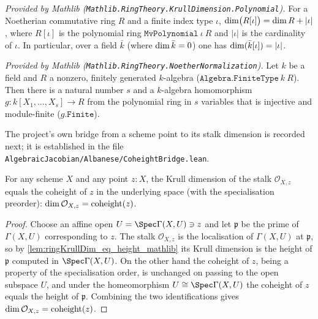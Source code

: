 \begin{lemma}
  \label{lem:mvpoly_ringKrullDim_mathlib}
  \mathlibok
  \textit{Provided by Mathlib (\texttt{Mathlib.RingTheory.KrullDimension.Polynomial}).}
  For a Noetherian commutative ring \(R\) and a finite index type \(\iota\),
  \(\dim\bigl(R[\iota]\bigr) = \dim R + \lvert\iota\rvert\), where
  \(R[\iota]\) is the polynomial ring \(\texttt{MvPolynomial}\ \iota\ R\) and
  \(\lvert\iota\rvert\) is the cardinality of \(\iota\).  In particular, over a field
  \(\bar k\) (where \(\dim \bar k = 0\)) one has \(\dim(\bar k[\iota]) =
  \lvert\iota\rvert\).
\end{lemma}

\begin{lemma}
  \label{lem:noether_normalization_mathlib}
  \mathlibok
  \textit{Provided by Mathlib (\texttt{Mathlib.RingTheory.NoetherNormalization}).}
  Let \(k\) be a field and \(R\) a nonzero, finitely generated \(k\)-algebra
  (\(\texttt{Algebra.FiniteType}\ k\ R\)).  Then there is a natural number \(s\) and a
  \(k\)-algebra homomorphism \(g : k[X_1,\dots,X_s] \to R\) from the polynomial ring in
  \(s\) variables that is injective and module-finite (\(g.\texttt{Finite}\)).
\end{lemma}

The project's own bridge from a scheme point to its stalk dimension is recorded next;
it is established in the file \texttt{AlgebraicJacobian/Albanese/CoheightBridge.lean}.

\begin{lemma}
  \label{lem:ringKrullDim_stalk_eq_coheight}
  For any scheme \(X\) and any point \(z : X\), the Krull dimension of the stalk
  \(\mathcal O_{X,z}\) equals the coheight of \(z\) in the underlying space (with the
  specialisation preorder): \(\dim \mathcal O_{X,z} = \operatorname{coheight}(z)\).
\end{lemma}

\begin{proof}
  \leanok
  Choose an affine open \(U = \Spec \Gamma(X,U) \ni z\) and let \(\mathfrak p\) be the
  prime of \(\Gamma(X,U)\) corresponding to \(z\).  The stalk \(\mathcal O_{X,z}\) is
  the localisation of \(\Gamma(X,U)\) at \(\mathfrak p\), so by
  \cref{lem:ringKrullDim_eq_height_mathlib} its Krull dimension is the height of
  \(\mathfrak p\) computed in \(\Spec \Gamma(X,U)\).  On the other hand the coheight
  of \(z\), being a property of the specialisation order, is unchanged on passing to
  the open subspace \(U\), and under the homeomorphism \(U \cong \Spec \Gamma(X,U)\)
  the coheight of \(z\) equals the height of \(\mathfrak p\).  Combining the two
  identifications gives \(\dim \mathcal O_{X,z} = \operatorname{coheight}(z)\).
\end{proof}

